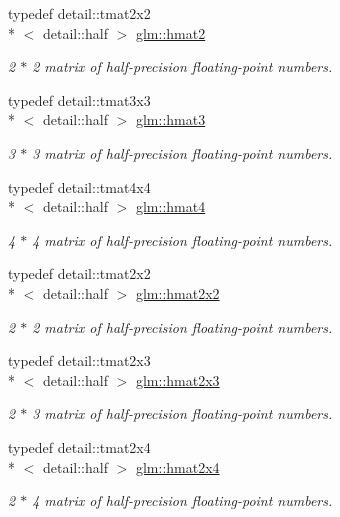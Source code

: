 \begin{DoxyCompactItemize}
typedef detail\-::tmat2x2\\*
$<$ detail\-::half $>$ \hyperlink{group__gtc__half__float_gaf5adf0fe534e1e97f0f162805c1a4dba}{glm\-::hmat2}
\begin{DoxyCompactList}\small\item\em 2 $\ast$ 2 matrix of half-\/precision floating-\/point numbers. \end{DoxyCompactList}\item 
typedef detail\-::tmat3x3\\*
$<$ detail\-::half $>$ \hyperlink{group__gtc__half__float_gacbd67f9ac28573409d5d1eede2ec0fcd}{glm\-::hmat3}
\begin{DoxyCompactList}\small\item\em 3 $\ast$ 3 matrix of half-\/precision floating-\/point numbers. \end{DoxyCompactList}\item 
typedef detail\-::tmat4x4\\*
$<$ detail\-::half $>$ \hyperlink{group__gtc__half__float_gaf5091515fa8c775f1e511d1e6790e968}{glm\-::hmat4}
\begin{DoxyCompactList}\small\item\em 4 $\ast$ 4 matrix of half-\/precision floating-\/point numbers. \end{DoxyCompactList}\item 
typedef detail\-::tmat2x2\\*
$<$ detail\-::half $>$ \hyperlink{group__gtc__half__float_ga8de844783e98b26f2d0f1be5dced0d43}{glm\-::hmat2x2}
\begin{DoxyCompactList}\small\item\em 2 $\ast$ 2 matrix of half-\/precision floating-\/point numbers. \end{DoxyCompactList}\item 
typedef detail\-::tmat2x3\\*
$<$ detail\-::half $>$ \hyperlink{group__gtc__half__float_ga620d92d90c323bb52a5a3c4df9b44bda}{glm\-::hmat2x3}
\begin{DoxyCompactList}\small\item\em 2 $\ast$ 3 matrix of half-\/precision floating-\/point numbers. \end{DoxyCompactList}\item 
typedef detail\-::tmat2x4\\*
$<$ detail\-::half $>$ \hyperlink{group__gtc__half__float_gae4525d297f7612882ac1e58ad938ac10}{glm\-::hmat2x4}
\begin{DoxyCompactList}\small\item\em 2 $\ast$ 4 matrix of half-\/precision floating-\/point numbers. \end{DoxyCompactList}\item 

\end{DoxyCompactItemize}
